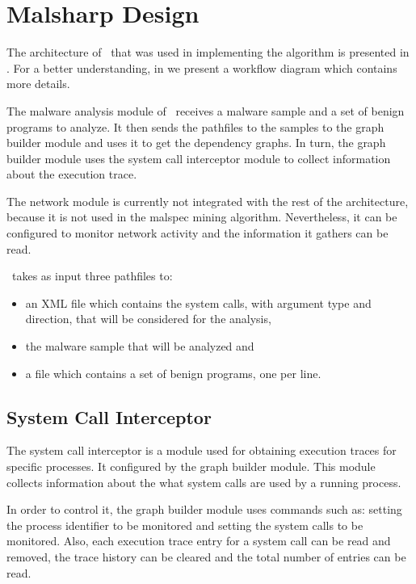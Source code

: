\section{Malsharp Design}
\label{third:design}

The architecture of \project\ that was used in implementing the algorithm is presented in . For a better understanding, in  we present a workflow diagram which contains more details.

The malware analysis module of \project\ receives a malware sample and a set of benign programs to analyze. It then sends the pathfiles to the samples to the graph builder module and uses it to get the dependency graphs. In turn, the graph builder module uses the system call interceptor module to collect information about the execution trace.

The network module is currently not integrated with the rest of the architecture, because it is not used in the malspec mining algorithm. Nevertheless, it can be configured to monitor network activity and the information it gathers can be read.


\project\ takes as input three pathfiles to: 
\begin{itemize}
	\item an XML file which contains the system calls, with argument type and direction, that will be considered for the analysis,
	\item the malware sample that will be analyzed and
	\item a file which contains a set of benign programs, one per line.
\end{itemize}

\subsection{System Call Interceptor}

The system call interceptor is a module used for obtaining execution traces for specific processes. It configured by the graph builder module. This module collects information about the what system calls are used by a running process.

In order to control it, the graph builder module uses commands such as: setting the process identifier to be monitored and setting the system calls to be monitored. Also, each execution trace entry for a system call can be read and removed, the trace history can be cleared and the total number of entries can be read.

